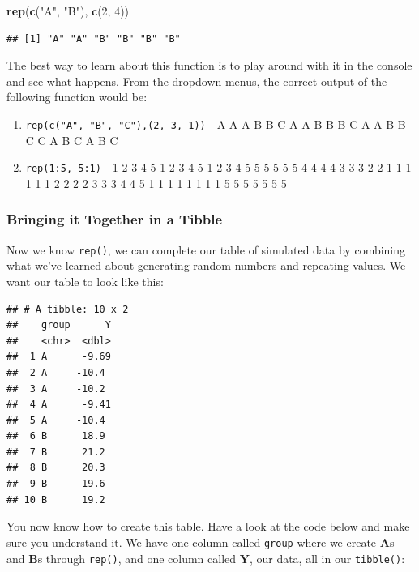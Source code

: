 \documentclass[]{book}
\newenvironment{Shaded}{\begin{snugshade}}{\end{snugshade}}
\newcommand{\DecValTok}[1]{\textcolor[rgb]{0.00,0.00,0.81}{#1}}
\newcommand{\KeywordTok}[1]{\textcolor[rgb]{0.13,0.29,0.53}{\textbf{#1}}}
\newcommand{\NormalTok}[1]{#1}
\newcommand{\StringTok}[1]{\textcolor[rgb]{0.31,0.60,0.02}{#1}}
\begin{document}
\begin{Shaded}
\begin{Highlighting}[]
\KeywordTok{rep}\NormalTok{(}\KeywordTok{c}\NormalTok{(}\StringTok{"A"}\NormalTok{, }\StringTok{"B"}\NormalTok{), }\KeywordTok{c}\NormalTok{(}\DecValTok{2}\NormalTok{, }\DecValTok{4}\NormalTok{))}
\end{Highlighting}
\end{Shaded}

\begin{verbatim}
## [1] "A" "A" "B" "B" "B" "B"
\end{verbatim}

The best way to learn about this function is to play around with it in the console and see what happens. From the dropdown menus, the correct output of the following function would be:

\begin{enumerate}
\def\labelenumi{\arabic{enumi}.}
\item
  \texttt{rep(c("A",\ "B",\ "C"),(2,\ 3,\ 1))} - A A A B B C A A B B B C A A B B C C A B C A B C
\item
  \texttt{rep(1:5,\ 5:1)} - 1 2 3 4 5 1 2 3 4 5 1 2 3 4 5 5 5 5 5 5 4 4 4 4 3 3 3 2 2 1 1 1 1 1 1 2 2 2 2 3 3 3 4 4 5 1 1 1 1 1 1 1 1 5 5 5 5 5 5 5
\end{enumerate}

\hypertarget{bringing-it-together-in-a-tibble}{%
\subsubsection{Bringing it Together in a Tibble}\label{bringing-it-together-in-a-tibble}}

Now we know \texttt{rep()}, we can complete our table of simulated data by combining what we've learned about generating random numbers and repeating values. We want our table to look like this:

\begin{verbatim}
## # A tibble: 10 x 2
##    group      Y
##    <chr>  <dbl>
##  1 A      -9.69
##  2 A     -10.4 
##  3 A     -10.2 
##  4 A      -9.41
##  5 A     -10.4 
##  6 B      18.9 
##  7 B      21.2 
##  8 B      20.3 
##  9 B      19.6 
## 10 B      19.2
\end{verbatim}

You now know how to create this table. Have a look at the code below and make sure you understand it. We have one column called \texttt{group} where we create \textbf{A}s and \textbf{B}s through \texttt{rep()}, and one column called \textbf{Y}, our data, all in our \texttt{tibble()}:
\end{document}
